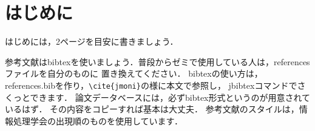 ﻿\section{はじめに}
はじめには，2ページを目安に書きましょう．

参考文献はbibtexを使いましょう．普段からゼミで使用している人は，referencesファイルを自分のものに
置き換えてください．
bibtexの使い方は，references.bibを作り，\verb|\cite{jmoni}|の様に本文で参照\cite{jmoni}し，
jbibtexコマンドでさくっとできます．
論文データベースには，必ずbibtex形式というのが用意されているはず．
その内容をコピーすれば基本は大丈夫．
参考文献のスタイルは，情報処理学会の出現順のものを使用しています．
